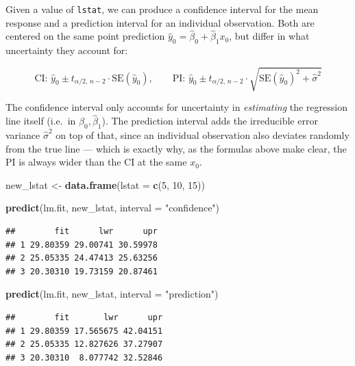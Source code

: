 \documentclass[
  11pt,
]{article}
\newenvironment{Shaded}{\begin{snugshade}}{\end{snugshade}}
\newcommand{\AttributeTok}[1]{\textcolor[rgb]{0.13,0.29,0.53}{#1}}
\newcommand{\DecValTok}[1]{\textcolor[rgb]{0.00,0.00,0.81}{#1}}
\newcommand{\FunctionTok}[1]{\textcolor[rgb]{0.13,0.29,0.53}{\textbf{#1}}}
\newcommand{\NormalTok}[1]{#1}
\newcommand{\OtherTok}[1]{\textcolor[rgb]{0.56,0.35,0.01}{#1}}
\newcommand{\StringTok}[1]{\textcolor[rgb]{0.31,0.60,0.02}{#1}}
\begin{document}
Given a value of \texttt{lstat}, we can produce a confidence interval
for the mean response and a prediction interval for an individual
observation. Both are centered on the same point prediction
\(\hat{y}_0 = \hat\beta_0 + \hat\beta_1 x_0\), but differ in what
uncertainty they account for:

\[
\text{CI: } \hat{y}_0 \pm t_{\alpha/2, \, n-2} \cdot \text{SE}(\hat{y}_0), \qquad
\text{PI: } \hat{y}_0 \pm t_{\alpha/2, \, n-2} \cdot \sqrt{\text{SE}(\hat{y}_0)^2 + \hat\sigma^2}
\]

The confidence interval only accounts for uncertainty in
\emph{estimating} the regression line itself (i.e.~in
\(\hat\beta_0, \hat\beta_1\)). The prediction interval adds the
irreducible error variance \(\hat\sigma^2\) on top of that, since an
individual observation also deviates randomly from the true line ---
which is exactly why, as the formulas above make clear, the PI is always
wider than the CI at the same \(x_0\).

\begin{Shaded}
\begin{Highlighting}[]
\NormalTok{new\_lstat }\OtherTok{\textless{}{-}} \FunctionTok{data.frame}\NormalTok{(}\AttributeTok{lstat =} \FunctionTok{c}\NormalTok{(}\DecValTok{5}\NormalTok{, }\DecValTok{10}\NormalTok{, }\DecValTok{15}\NormalTok{))}

\FunctionTok{predict}\NormalTok{(lm.fit, new\_lstat, }\AttributeTok{interval =} \StringTok{"confidence"}\NormalTok{)}
\end{Highlighting}
\end{Shaded}

\begin{verbatim}
##        fit      lwr      upr
## 1 29.80359 29.00741 30.59978
## 2 25.05335 24.47413 25.63256
## 3 20.30310 19.73159 20.87461
\end{verbatim}

\begin{Shaded}
\begin{Highlighting}[]
\FunctionTok{predict}\NormalTok{(lm.fit, new\_lstat, }\AttributeTok{interval =} \StringTok{"prediction"}\NormalTok{)}
\end{Highlighting}
\end{Shaded}

\begin{verbatim}
##        fit       lwr      upr
## 1 29.80359 17.565675 42.04151
## 2 25.05335 12.827626 37.27907
## 3 20.30310  8.077742 32.52846
\end{verbatim}
\end{document}
